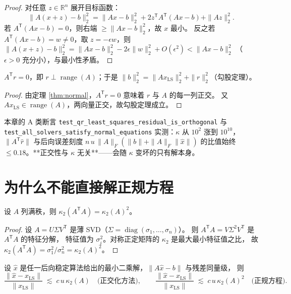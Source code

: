 \begin{proof}
对任意 $z\in\mathbb{R}^n$ 展开目标函数：
\[
  \|A(x+z)-b\|_2^2=\|Ax-b\|_2^2+2z^{\mathsf T}A^{\mathsf T}(Ax-b)+\|Az\|_2^2 .
\]
若 $A^{\mathsf T}(Ax-b)=0$，则右端 $\ge\|Ax-b\|_2^2$，故 $x$ 最小。
反之若 $A^{\mathsf T}(Ax-b)=w\ne0$，取 $z=-\epsilon w$，则
$\|A(x+z)-b\|_2^2=\|Ax-b\|_2^2-2\epsilon\|w\|_2^2+O(\epsilon^2)<\|Ax-b\|_2^2$
（$\epsilon>0$ 充分小），与最小性矛盾。
\end{proof}

\begin{corollary}[残差与列空间正交]
\label{cor:orth}
$A^{\mathsf T}r=0$，即 $r\perp\operatorname{range}(A)$；于是
$\|b\|_2^2=\|Ax_{\mathrm{LS}}\|_2^2+\|r\|_2^2$（勾股定理）。
\end{corollary}

\begin{proof}
由定理 \ref{thm:normal}，$A^{\mathsf T}r=0$ 意味着 $r$ 与 $A$ 的每一列正交。
又 $Ax_{\mathrm{LS}}\in\operatorname{range}(A)$，两向量正交，故勾股定理成立。
\end{proof}

\begin{remark}[正交性是三条路线的共同点]
本章的 A 类断言 \texttt{test\_qr\_least\_squares\_residual\_is\_orthogonal} 与
\texttt{test\_all\_solvers\_satisfy\_normal\_equations} 实测：$\kappa$ 从 $10^{2}$ 涨到 $10^{10}$，
$\|A^{\mathsf T}\hat r\|$ 与后向误差刻度 $n\,u\,\|A\|_F(\|b\|+\|A\|_F\|\hat x\|)$ 的比值始终
$\le0.18$。**正交性与 $\kappa$ 无关**——会随 $\kappa$ 变坏的只有解本身。
\end{remark}

\section{为什么不能直接解正规方程}

\begin{theorem}[条件数的平方]
\label{thm:kappa2}
设 $A$ 列满秩，则 $\kappa_2(A^{\mathsf T}A)=\kappa_2(A)^2$。
\end{theorem}

\begin{proof}
设 $A=U\Sigma V^{\mathsf T}$ 是薄 SVD（$\Sigma=\operatorname{diag}(\sigma_1,\dots,\sigma_n)$）。
则 $A^{\mathsf T}A=V\Sigma^2V^{\mathsf T}$ 是 $A^{\mathsf T}A$ 的特征分解，
特征值为 $\sigma_i^2$。对称正定矩阵的 $\kappa_2$ 是最大最小特征值之比，
故 $\kappa_2(A^{\mathsf T}A)=\sigma_1^2/\sigma_n^2=\kappa_2(A)^2$。
\end{proof}

\begin{theorem}[前向误差的两把尺子]
\label{thm:forward}
设 $\hat x$ 是任一后向稳定算法给出的最小二乘解，$\|A\hat x-b\|$ 与残差同量级，
则
\[
  \frac{\|\hat x-x_{\mathrm{LS}}\|}{\|x_{\mathrm{LS}}\|}
  \;\lesssim\; c\,u\,\kappa_2(A)\quad\text{(正交化方法)},\qquad
  \frac{\|\hat x-x_{\mathrm{LS}}\|}{\|x_{\mathrm{LS}}\|}
  \;\lesssim\; c\,u\,\kappa_2(A)^2\quad\text{(正规方程)} .
\]
\end{theorem}

